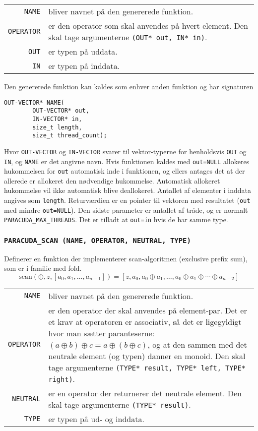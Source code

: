 \noindent\begin{tabular}{rp{8cm}}
\texttt{NAME} & bliver navnet på den genererede funktion. \\
\texttt{OPERATOR} & er den operator som skal anvendes på hvert element.
Den skal tage argumenterne \verb|(OUT* out, IN* in)|. \\
\texttt{OUT} & er typen på uddata. \\
\texttt{IN} & er typen på inddata. \\
\end{tabular}\vspace{0.2cm}

Den genererede funktion kan kaldes som enhver anden funktion og har signaturen

\begin{verbatim}
OUT-VECTOR* NAME(
        OUT-VECTOR* out, 
        IN-VECTOR* in, 
        size_t length, 
        size_t thread_count);
\end{verbatim}

Hvor \verb|OUT-VECTOR| og \verb|IN-VECTOR| svarer til vektor-typerne for henholdsvis
\verb|OUT| og \verb|IN|, og \verb|NAME| er det angivne navn. 
Hvis funktionen kaldes med \verb|out=NULL| allokeres hukommelsen 
for \verb|out| automatisk inde i funktionen, og ellers antages det at der allerede er 
allokeret den nødvendige hukommelse. Automatisk allokeret hukommelse vil ikke automatisk
blive deallokeret. Antallet af elementer i inddata angives som \verb|length|. 
Returværdien er en pointer til vektoren med resultatet (\verb|out| med mindre \verb|out=NULL|).
Den sidste parameter er antallet af tråde, og er normalt \verb|PARACUDA_MAX_THREADS|.
Det er tilladt at \verb|out=in| hvis de har samme type.

\subsubsection*{\texttt{PARACUDA\_SCAN \scriptsize(NAME, OPERATOR, NEUTRAL, TYPE)}}
Definerer en funktion der implementerer scan-algoritmen (exclusive prefix sum),
som er i familie med fold.
\[
\mbox{scan}(\oplus, z, [a_0, a_1, \ldots, a_{n-1}]) = [z, a_0, a_0 \oplus a_1, \ldots, a_0 \oplus a_1 \oplus \cdots \oplus a_{n-2}]
\]

\noindent\begin{tabular}{rp{8cm}}
\texttt{NAME} & bliver navnet på den genererede funktion. \\
\texttt{OPERATOR} & er den operator der skal anvendes på element-par.
Det er et krav at operatoren er associativ, så det er ligegyldigt hvor man sætter paranteserne: 
$(a\oplus b)\oplus c = a\oplus (b\oplus c)$, og at den sammen med det neutrale element
(og typen) danner en monoid. Den skal tage argumenterne 
\verb|(TYPE* result, TYPE* left, TYPE* right)|. \\
\texttt{NEUTRAL} & er en operator der returnerer det neutrale element. 
Den skal tage argumenterne 
\verb|(TYPE* result)|. \\
\texttt{TYPE} & er typen på ud- og inddata. \\
\end{tabular}\vspace{0.2cm}

